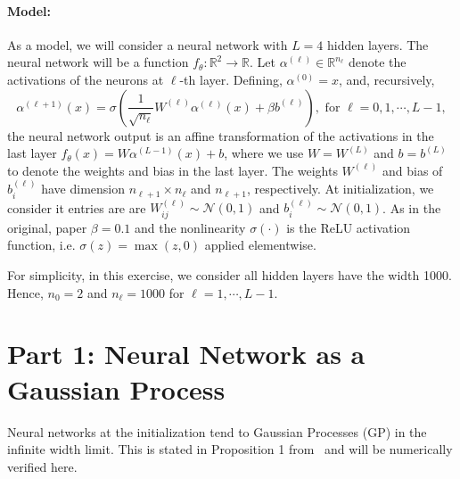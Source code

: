 \documentclass[a4paper,10pt]{article}
\newcommand{\R}{\mathbb{R}}
\newcommand{\N}{\mathcal{N}}
\newcounter{exercise}
\begin{document}
\paragraph{Model:} As a model, we will consider a neural network with $L=4$ hidden layers. The neural network will be a function
$f_{\theta}: \R^2 \rightarrow \R$. Let $\alpha^{(\ell)}\in \R^{n_\ell}$ denote the activations of the neurons at $\ell$-th layer. Defining,  $\alpha^{(0)} = x$, and, recursively,
\begin{equation}
    \label{eq:nn}
    \alpha^{(\ell+1)}(x) = \sigma\left(\frac{1}{\sqrt{n_\ell}} W^{(\ell)} \alpha^{(\ell)}(x)  + \beta b^{(\ell)} \right), \text{ for } \ell = 0, 1, \cdots, L-1,
\end{equation}
the neural network output is an affine transformation of the activations in the last layer $f_{\theta}(x) = W \alpha^{(L-1)}(x) + b$, where we use $W = W^{(L)}$ and $b = b^{(L)}$ to denote the weights and bias in the last layer. The weights $W^{(\ell)}$ and bias of  $b^{(\ell)}_{i}$ have dimension $n_{\ell+1} \times n_{\ell}$ and $n_{\ell+1}$, respectively. At initialization, we consider it entries are are $W^{(\ell)}_{ij} \sim \N(0, 1)$ and $b^{(\ell)}_{i} \sim \N(0, 1)$. As in the original, paper $\beta = 0.1$
and the nonlinearity $\sigma(\cdot)$ is the ReLU activation function, i.e. $\sigma(z) = \max(z, 0)$ applied elementwise.

For simplicity, in this exercise, we consider all hidden layers have the width 1000. Hence, $n_0 =2$ and $n_\ell = 1000$ for $\ell= 1, \cdots, L-1$.



\section*{Part 1: Neural Network as a Gaussian Process}

Neural networks at the initialization tend to Gaussian Processes (GP) in the infinite width limit. This is stated in Proposition 1 from~\citep{jacot_neural_2018} and will be numerically verified here.
\end{document}
